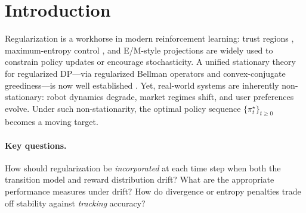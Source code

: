 \documentclass{article}
\theoremstyle{plain}
\theoremstyle{definition}
\theoremstyle{remark}
\newcommand{\1}{\mathbbm{1}}
\begin{document}
\section{Introduction}
Regularization is a workhorse in modern reinforcement learning: trust regions \cite{schulman2015trpo}, maximum-entropy control \cite{haarnoja2018sac}, and E/M-style projections \cite{abdolmaleki2018mpo} are widely used to constrain policy updates or encourage stochasticity. A unified stationary theory for regularized DP---via regularized Bellman operators and convex-conjugate greediness---is now well established \cite{geist2019theory}. Yet, real-world systems are inherently non-stationary: robot dynamics degrade, market regimes shift, and user preferences evolve. Under such non-stationarity, the optimal policy sequence $\{\pi_t^\star\}_{t \ge 0}$ becomes a moving target.

\paragraph{Key questions.} How should regularization be \emph{incorporated} at each time step when both the transition model and reward distribution drift? What are the appropriate performance measures under drift? How do divergence or entropy penalties trade off stability against \emph{tracking} accuracy?
\end{document}
